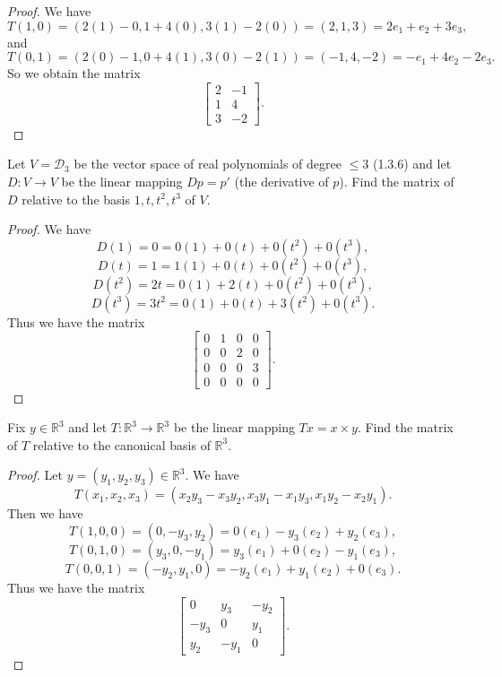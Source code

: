 \begin{proof}
    We have 
    \[T(1, 0) = (2(1) - 0, 1 + 4(0), 3(1) - 2(0)) = (2, 1, 3) = 2e_1 + e_2 + 3e_3,\]
    and 
    \[T(0, 1) = (2(0) - 1, 0 + 4(1), 3(0) - 2(1)) = (-1, 4, -2) = -e_1 + 4e_2 - 2e_3.\]
    So we obtain the matrix 
    \[
    \begin{bmatrix}
    2 & -1 \\
    1 & 4 \\
    3 & -2   
    \end{bmatrix}
    .\]
\end{proof}


\begin{tcolorbox}[title=Exercise 4, breakable]
    Let $V = \mathcal{D}_3$ be the vector space 
    of real polynomials of degree $\le 3$ (1.3.6)
    and let $D : V \longrightarrow V$ be the 
    linear mapping $Dp = p'$ (the derivative of $p$).
    Find the matrix of $D$ relative to the 
    basis $1, t, t^2, t^3$ of $V$.
\end{tcolorbox}

\begin{proof}
    We have 
    \[D(1) = 0 = 0(1) + 0(t) + 0(t^2) + 0(t^3),\]
    \[D(t) = 1 = 1(1) + 0(t) + 0(t^2) + 0(t^3),\]
    \[D(t^2) = 2t = 0(1) + 2(t) + 0(t^2) + 0(t^3),\]
    \[D(t^3) = 3t^2 = 0(1) + 0(t) + 3(t^2) + 0(t^3).\]
    Thus we have the matrix
    \[
    \begin{bmatrix}
    0 & 1 & 0 & 0 \\
    0 & 0 & 2 & 0 \\
    0 & 0 & 0 & 3 \\
    0 & 0 & 0 & 0
    \end{bmatrix}
    .\]
\end{proof}

\begin{tcolorbox}[title=Exercise 5, breakable]
    Fix $y \in \mathbb{R}^3$ and let 
    $T : \mathbb{R}^3 \longrightarrow \mathbb{R}^3$ 
    be the linear mapping $Tx = x \times y$.
    Find the matrix of $T$ relative to the canonical basis of $\mathbb{R}^3$.
\end{tcolorbox}

\begin{proof}
    Let $y = (y_1, y_2, y_3) \in \mathbb{R}^3$.
    We have 
    \[T(x_1, x_2, x_3) = (x_2 y_3 - x_3 y_2, x_3 y_1 - x_1 y_3, x_1 y_2 - x_2 y_1).\]
    Then we have 
    \[T(1, 0, 0) = (0, -y_3, y_2) = 0(e_1) - y_3(e_2) + y_2(e_3),\]
    \[T(0, 1, 0) = (y_3, 0, -y_1) = y_3(e_1) + 0(e_2) - y_1(e_3),\]
    \[T(0, 0, 1) = (-y_2, y_1, 0) = -y_2(e_1) + y_1(e_2) + 0(e_3).\]
    Thus we have the matrix
    \[
    \begin{bmatrix}
    0 & y_3 & -y_2 \\
    -y_3 & 0 & y_1 \\
    y_2 & -y_1 & 0
    \end{bmatrix}
    .\]
\end{proof}


